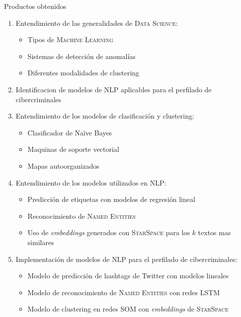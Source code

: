 \documentclass[10pt]{beamer}
\begin{document}
\begin{frame}[allowframebreaks]{Productos obtenidos}
  \begin{enumerate}
  \item Entendimiento de las generalidades de \textsc{Data Science}:
    \begin{itemize}
    \item Tipos de \textsc{Machine Learning}
    \item Sistemas de detección de anomalías
    \item Diferentes modalidades de clustering
    \end{itemize}
  \item Identificacion de modelos de \textsc{NLP} aplicables para el perfilado de cibercriminales
    
  \item Entendimiento de los modelos de clasificación y clustering:
    \begin{itemize}
    \item Clasificador de Na\"ive Bayes
    \item Maquinas de soporte vectorial
    \item Mapas autoorganizados
    \end{itemize}
    
  \item Entendimiento de los modelos utilizados en \textsc{NLP}:
    \begin{itemize}
    \item Predicción de etiquetas con modelos de regresión lineal
    \item Reconocimiento de \textsc{Named Entities}
    \item Uso de \emph{embeddings} generados con \textsc{StarSpace} para los $k$ textos mas similares
    \end{itemize}
    
  \item Implementación de modelos de \textsc{NLP} para el perfilado de cibercriminales:
    \begin{itemize}
    \item Modelo de predicción de hashtags de Twitter con modelos lineales
    \item Modelo de reconocimiento de \textsc{Named Entities} con redes \textsc{LSTM}
    \item Modelo de clustering en redes \textsc{SOM} con \emph{embeddings} de \textsc{StarSpace}
    \end{itemize}
    
  \end{enumerate}
\end{frame}
\end{document}
